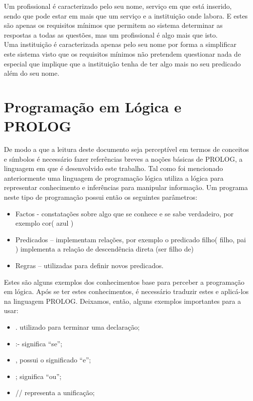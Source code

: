 Um profissional é caracterizado pelo seu nome, serviço em que está inserido, sendo que pode estar em mais que um serviço e a instituição onde labora. E estes são apenas os requisitos mínimos que permitem ao sistema determinar as respostas a todas as questões, mas um profissional é algo mais que isto. 
\\

Uma instituição é caracterizada apenas pelo seu nome por forma a simplificar este sistema visto que os requisitos mínimos não pretendem questionar nada de especial que implique que a instituição tenha de ter algo mais no seu predicado além do seu nome.


\section{Programação em Lógica e PROLOG}
\label{p2:proglogprolog}
De modo a que a leitura deste documento seja perceptível em termos de conceitos e símbolos é necessário fazer referências breves a noções básicas de PROLOG, a linguagem em que é desenvolvido este trabalho.
Tal como foi mencionado anteriormente uma linguagem de programação lógica utiliza a lógica para representar conhecimento e inferências para manipular informação. Um programa neste tipo de programação possui então os seguintes parâmetros:

\begin{itemize}
	\item Factos - constatações sobre algo que se conhece e se sabe verdadeiro, por exemplo cor( azul )
	\item Predicados – implementam relações, por exemplo o predicado filho( filho, pai ) implementa a relação de descendência direta (ser filho de)
	\item Regras – utilizadas para definir novos predicados. 
\end{itemize}

Estes são alguns exemplos dos conhecimentos base para perceber a programação em lógica.
Após se ter estes conhecimentos, é necessário traduzir estes e aplicá-los na linguagem PROLOG.
Deixamos, então, alguns exemplos importantes para a usar:

\begin{itemize}
	\item .  utilizado para terminar uma declaração;
	\item :-  significa “se”;
	\item ,  possui o significado “e”;
	\item ;  significa “ou”;
	\item //  representa a unificação;
\end{itemize}

